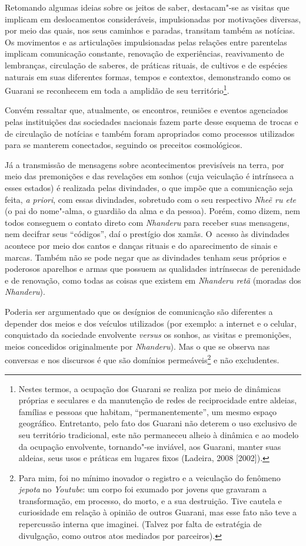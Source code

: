 Retomando algumas ideias sobre os jeitos de saber, destacam"-se as
visitas que implicam em deslocamentos consideráveis, impulsionadas por
motivações diversas, por meio das quais, nos seus caminhos e paradas,
transitam também as notícias. Os movimentos e as articulações
impulsionadas pelas relações entre parentelas implicam comunicação
constante, renovação de experiências, reavivamento de lembranças,
circulação de saberes, de práticas rituais, de cultivos e de espécies
naturais em suas diferentes formas, tempos e contextos, demonstrando
como os Guarani se reconhecem em toda a amplidão de seu
território\footnote{Nestes termos, a ocupação dos Guarani se realiza
por meio de dinâmicas próprias e seculares e da manutenção de redes de
reciprocidade entre aldeias, famílias e pessoas que habitam,
``permanentemente'', um mesmo espaço geográfico. Entretanto, pelo fato
dos Guarani não deterem o uso exclusivo de seu território tradicional,
este não permaneceu alheio à dinâmica e ao modelo da ocupação
envolvente, tornando"-se inviável, aos Guarani, manter suas aldeias,
seus usos e práticas em lugares fixos (Ladeira, 2008 [2002]). }. 

Convém ressaltar que, atualmente, os encontros, reuniões e eventos
agenciados pelas instituições das sociedades nacionais fazem parte
desse esquema de trocas e de circulação de notícias e também foram
apropriados como processos utilizados para se manterem conectados,
seguindo os preceitos cosmológicos.

Já a transmissão de mensagens sobre acontecimentos previsíveis na terra,
por meio das premonições e das revelações em sonhos (cuja veiculação é
intrínseca a esses estados) é realizada pelas divindades, o que impõe
que a comunicação seja feita, \emph{a priori}, com essas divindades, sobretudo
com o seu respectivo \emph{Nheẽ ru ete} (o pai do nome"-alma, o guardião
da alma e da pessoa). Porém, como dizem, nem todos conseguem o contato
direto com \emph{Nhanderu} para receber suas mensagens, nem decifrar seus
``códigos'', daí o prestígio dos xamãs. O~acesso às divindades acontece
por meio dos cantos e danças rituais e do aparecimento de sinais e
marcas. Também não se pode negar que as divindades tenham seus próprios
e poderosos aparelhos e armas que possuem as qualidades intrínsecas de
perenidade e de renovação, como todas as coisas que existem em \emph{Nhanderu
retã} (moradas dos \emph{Nhanderu}). 

Poderia ser argumentado que os desígnios de comunicação são diferentes a
depender dos meios e dos veículos utilizados (por exemplo: a internet e
o celular, conquistado da sociedade envolvente \emph{versus} os sonhos, as
visitas e premonições, meios concedidos originalmente por \emph{Nhanderu}).
Mas o que se observa nas conversas e nos discursos é que são domínios
permeáveis\footnote{Para mim, foi no mínimo inovador o registro e a
veiculação do fenômeno \emph{jepota} no \emph{Youtube}: um corpo foi exumado por
jovens que gravaram a transformação, em processo, do morto, e a sua
destruição. Tive cautela e curiosidade em relação à opinião de outros
Guarani, mas esse fato não teve a repercussão interna que imaginei.
(Talvez por falta de estratégia de divulgação, como outros atos
mediados por parceiros).} e não excludentes.

